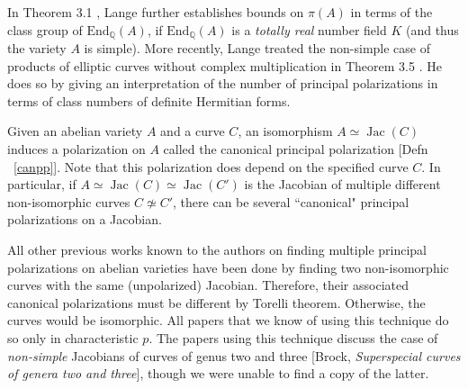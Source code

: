\documentclass[12pt,reqno]{amsart}
\DeclareMathOperator{\Jac}{Jac}
\newcommand{\Q}{\mathbb{Q}}
\theoremstyle{definition}
\theoremstyle{remark}
\newtheorem*{remark}{Remark}
\begin{document}
In Theorem 3.1 \cite{several}, Lange further establishes bounds on $\pi(A)$ in terms of the class group of $\text{End}_{\Q}(A)$, if $\text{End}_{\Q}(A)$ is a \textit{totally real} number field $K$ (and thus the variety $A$ is simple). More recently, Lange treated the non-simple case of products of elliptic curves without complex multiplication in Theorem 3.5 \cite{newlange}. He does so by giving an interpretation of the number of principal polarizations in terms of class numbers of definite Hermitian forms.



Given an abelian variety $A$ and a curve $C$, an isomorphism $A \simeq \Jac(C)$ induces a polarization on $A$ called the canonical principal polarization [Defn ~\ref{canpp}]. Note that this polarization does depend on the specified curve $C$. In particular, if $A \simeq \Jac(C) \simeq \Jac(C')$ is the Jacobian of multiple different non-isomorphic curves $C \not\simeq C'$, there can be several ``canonical" principal polarizations on a Jacobian.


All other previous works known to the authors on finding multiple principal polarizations on abelian varieties have been done by finding two non-isomorphic curves with the same (unpolarized) Jacobian. Therefore, their associated canonical polarizations must be different by Torelli theorem. Otherwise, the curves would be isomorphic. All papers that we know of using this technique do so only in characteristic $p$. The papers using this technique discuss the case of \textit{non-simple} Jacobians of curves of genus two \cite{iko} and three [Brock, \textit{Superspecial curves of genera two and three}], though we were unable to find a copy of the latter. 
\end{document}
